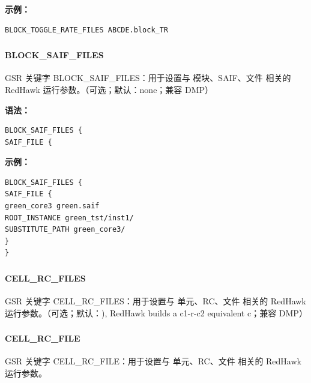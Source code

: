 \textbf{示例：}
\begin{lstlisting}
BLOCK_TOGGLE_RATE_FILES ABCDE.block_TR
\end{lstlisting}

\subsubsection{}
\paragraph*{BLOCK_SAIF_FILES}

GSR 关键字 BLOCK_SAIF_FILES：用于设置与 模块、SAIF、文件 相关的 RedHawk 运行参数。（可选；默认：none；兼容 DMP）

\textbf{语法：}
\begin{lstlisting}
BLOCK_SAIF_FILES {
SAIF_FILE {
\end{lstlisting}

\textbf{示例：}
\begin{lstlisting}
BLOCK_SAIF_FILES {
SAIF_FILE {
green_core3 green.saif
ROOT_INSTANCE green_tst/inst1/
SUBSTITUTE_PATH green_core3/
}
}
\end{lstlisting}

\subsubsection{}
\paragraph*{CELL_RC_FILES}

GSR 关键字 CELL_RC_FILES：用于设置与 单元、RC、文件 相关的 RedHawk 运行参数。（可选；默认：), RedHawk builds a c1-r-c2 equivalent c；兼容 DMP）

\subsubsection{}
\paragraph*{CELL_RC_FILE}

GSR 关键字 CELL_RC_FILE：用于设置与 单元、RC、文件 相关的 RedHawk 运行参数。

\subsubsection{}
